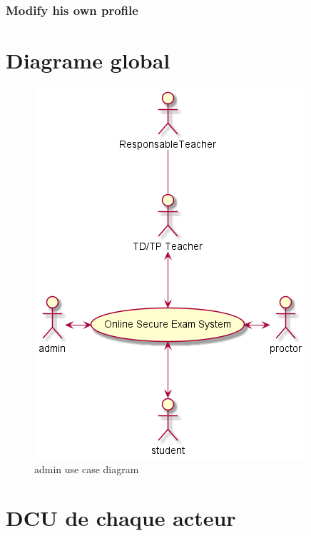 \documentclass[a4paper,12p]{article}
\begin{document}
     \subsubsection{Modify his own profile}

     \section{Diagrame global }

     \begin{figure}[h]
         \centering
         \includegraphics[width=\textwidth]{SCD}
         \caption{admin use case diagram}
     \end{figure}

     \section{DCU de chaque acteur}
\end{document}
